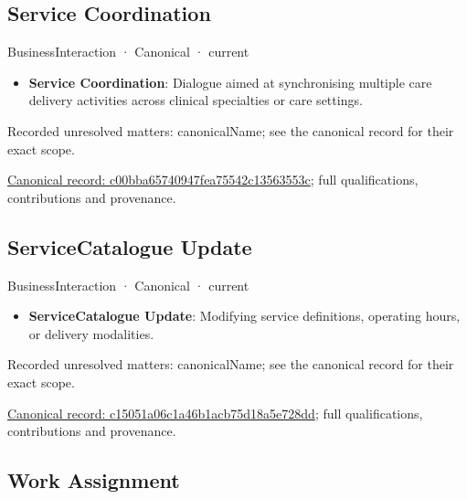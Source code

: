 \subsection{Service Coordination}

\label{element:c00bba65740947fea75542c13563553c}
{\small BusinessInteraction · Canonical · current}\par

\begin{itemize}


\item \textbf{Service Coordination}: Dialogue aimed at synchronising multiple care delivery activities across clinical specialties or care settings.

\end{itemize}

{\small Recorded unresolved matters: canonicalName; see the canonical record for their exact scope.}\par
{\footnotesize \href{../../../../continuum/business/business-interaction/c00bba65740947fea75542c13563553c.md}{Canonical record: c00bba65740947fea75542c13563553c}; full qualifications, contributions and provenance.}\par
\subsection{ServiceCatalogue Update}

\label{element:c15051a06c1a46b1acb75d18a5e728dd}
{\small BusinessInteraction · Canonical · current}\par

\begin{itemize}


\item \textbf{ServiceCatalogue Update}: Modifying service definitions, operating hours, or delivery modalities.

\end{itemize}

{\small Recorded unresolved matters: canonicalName; see the canonical record for their exact scope.}\par
{\footnotesize \href{../../../../continuum/business/business-interaction/c15051a06c1a46b1acb75d18a5e728dd.md}{Canonical record: c15051a06c1a46b1acb75d18a5e728dd}; full qualifications, contributions and provenance.}\par
\subsection{Work Assignment}

